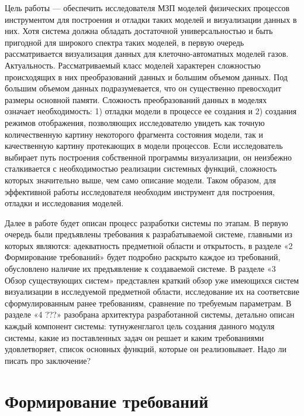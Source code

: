 \documentclass[a4paper,12pt]{extarticle}
\let\stdsection\section
\renewcommand\section{
    \newpage
    \stdsection
}
\begin{document}
Цель работы — обеспечить исследователя МЗП моделей физических процессов инструментом для построения и отладки таких моделей и визуализации данных в них. Хотя система должна обладать достаточной универсальностью и быть пригодной для широкого спектра таких моделей, в первую очередь рассматривается визуализация данных для клеточно-автоматных моделей газов. 
Актуальность. Рассматриваемый класс моделей характерен сложностью происходящих в них преобразований данных и большим объемом данных. Под большим объемом данных подразумевается, что он существенно превосходит размеры основной памяти. Сложность преобразований данных в моделях означает необходимость: 1) отладки модели в процессе ее создания и 2) создания режимов отображения, позволяющих исследователю увидеть как точную количественную картину некоторого фрагмента состояния модели, так и качественную картину протекающих в модели процессов. Если исследователь выбирает путь построения собственной программы визуализации, он неизбежно сталкивается с необходимостью реализации системных функций, сложность которых значительно выше, чем само описание модели.  Таком образом, для эффективной работы исследователя необходим инструмент для построения, отладки и исследования моделей.







Далее в работе будет описан процесс разработки системы по этапам. В первую очередь были предъявлены требования к разрабатываемой системе, главными из которых являются: адекватность предметной области и открытость, в разделе «2 Формирование требований» будет подробно раскрыто каждое из требований, обусловлено наличие их предъявление к создаваемой системе. В разделе «3 Обзор существующих систем» представлен краткий обзор уже имеющихся систем визуализации в исследуемой предметной области, исследование их на соответсвие сформулированным ранее требованиям, сравнение по требуемым параметрам. В разделе «4 ???» разобрана архитектура разработанной системы, детально описан каждый компонент системы: тутнуженглагол цель создания данного модуля системы, какие из поставленных задач он решает и каким требованиями удовлетворяет, список основных функций, которые он реализовывает. Надо ли писать про заключение?




\section{Формирование требований}
\label{sec:requirements}
\end{document}

